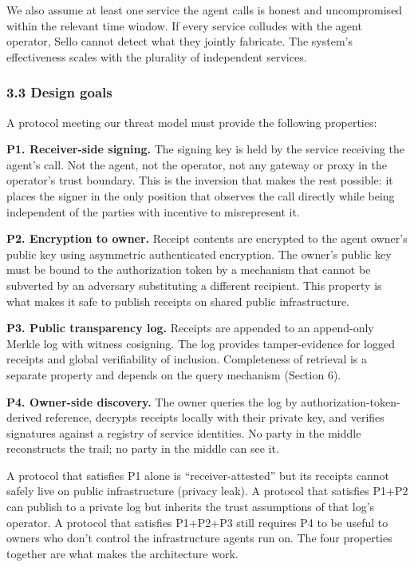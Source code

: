 \documentclass[
  11pt,
]{article}
\begin{document}
We also assume at least one service the agent calls is honest and
uncompromised within the relevant time window. If every service colludes
with the agent operator, Sello cannot detect what they jointly
fabricate. The system's effectiveness scales with the plurality of
independent services.

\hypertarget{design-goals}{%
\subsubsection{3.3 Design goals}\label{design-goals}}

A protocol meeting our threat model must provide the following
properties:

\textbf{P1. Receiver-side signing.} The signing key is held by the
service receiving the agent's call. Not the agent, not the operator, not
any gateway or proxy in the operator's trust boundary. This is the
inversion that makes the rest possible: it places the signer in the only
position that observes the call directly while being independent of the
parties with incentive to misrepresent it.

\textbf{P2. Encryption to owner.} Receipt contents are encrypted to the
agent owner's public key using asymmetric authenticated encryption. The
owner's public key must be bound to the authorization token by a
mechanism that cannot be subverted by an adversary substituting a
different recipient. This property is what makes it safe to publish
receipts on shared public infrastructure.

\textbf{P3. Public transparency log.} Receipts are appended to an
append-only Merkle log with witness cosigning. The log provides
tamper-evidence for logged receipts and global verifiability of
inclusion. Completeness of retrieval is a separate property and depends
on the query mechanism (Section 6).

\textbf{P4. Owner-side discovery.} The owner queries the log by
authorization-token-derived reference, decrypts receipts locally with
their private key, and verifies signatures against a registry of service
identities. No party in the middle reconstructs the trail; no party in
the middle can see it.

A protocol that satisfies P1 alone is ``receiver-attested'' but its
receipts cannot safely live on public infrastructure (privacy leak). A
protocol that satisfies P1+P2 can publish to a private log but inherits
the trust assumptions of that log's operator. A protocol that satisfies
P1+P2+P3 still requires P4 to be useful to owners who don't control the
infrastructure agents run on. The four properties together are what
makes the architecture work.
\end{document}
